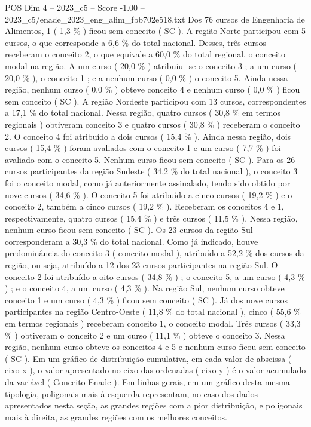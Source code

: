 \begin{textsample}{POS Dim 4 – 2023\_c5 – Score -1.00 – 2023\_c5/enade\_2023\_eng\_alim\_fbb702e518.txt}
Dos 76 cursos de Engenharia de Alimentos, 1 ( 1,3 \% ) ficou sem conceito ( SC ).
A região Norte participou com 5 cursos, o que corresponde a 6,6 \% do total nacional.
Desses, três cursos receberam o conceito 2, o que equivale a 60,0 \% do total regional, o conceito modal na região.
A um curso ( 20,0 \% ) atribuiu -se o conceito 3 ; a um curso ( 20,0 \% ), o conceito 1 ; e a nenhum curso ( 0,0 \% ) o conceito 5.
Ainda nessa região, nenhum curso ( 0,0 \% ) obteve conceito 4 e nenhum curso ( 0,0 \% ) ficou sem conceito ( SC ).
A região Nordeste participou com 13 cursos, correspondentes a 17,1 \% do total nacional.
Nessa região, quatro cursos ( 30,8 \% em termos regionais ) obtiveram conceito 3 e quatro cursos ( 30,8 \% ) receberam o conceito 2.
O conceito 4 foi atribuído a dois cursos ( 15,4 \% ).
Ainda nessa região, dois cursos ( 15,4 \% ) foram avaliados com o conceito 1 e um curso ( 7,7 \% ) foi avaliado com o conceito 5.
Nenhum curso ficou sem conceito ( SC ).
Para os 26 cursos participantes da região Sudeste ( 34,2 \% do total nacional ), o conceito 3 foi o conceito modal, como já anteriormente assinalado, tendo sido obtido por nove cursos ( 34,6 \% ).
O conceito 5 foi atribuído a cinco cursos ( 19,2 \% ) e o conceito 2, também a cinco cursos ( 19,2 \% ).
Receberam os conceitos 4 e 1, respectivamente, quatro cursos ( 15,4 \% ) e três cursos ( 11,5 \% ).
Nessa região, nenhum curso ficou sem conceito ( SC ).
Os 23 cursos da região Sul corresponderam a 30,3 \% do total nacional.
Como já indicado, houve predominância do conceito 3 ( conceito modal ), atribuído a 52,2 \% dos cursos da região, ou seja, atribuído a 12 dos 23 cursos participantes na região Sul.
O conceito 2 foi atribuído a oito cursos ( 34,8 \% ) ; o conceito 5, a um curso ( 4,3 \% ) ; e o conceito 4, a um curso ( 4,3 \% ).
Na região Sul, nenhum curso obteve conceito 1 e um curso ( 4,3 \% ) ficou sem conceito ( SC ).
Já dos nove cursos participantes na região Centro-Oeste ( 11,8 \% do total nacional ), cinco ( 55,6 \% em termos regionais ) receberam conceito 1, o conceito modal.
Três cursos ( 33,3 \% ) obtiveram o conceito 2 e um curso ( 11,1 \% ) obteve o conceito 3.
Nessa região, nenhum curso obteve os conceitos 4 e 5 e nenhum curso ficou sem conceito ( SC ).
Em um gráfico de distribuição cumulativa, em cada valor de abscissa ( eixo x ), o valor apresentado no eixo das ordenadas ( eixo y ) é o valor acumulado da variável ( Conceito Enade ).
Em linhas gerais, em um gráfico desta mesma tipologia, poligonais mais à esquerda representam, no caso dos dados apresentados nesta seção, as grandes regiões com a pior distribuição, e poligonais mais à direita, as grandes regiões com os melhores conceitos.

\end{textsample}
